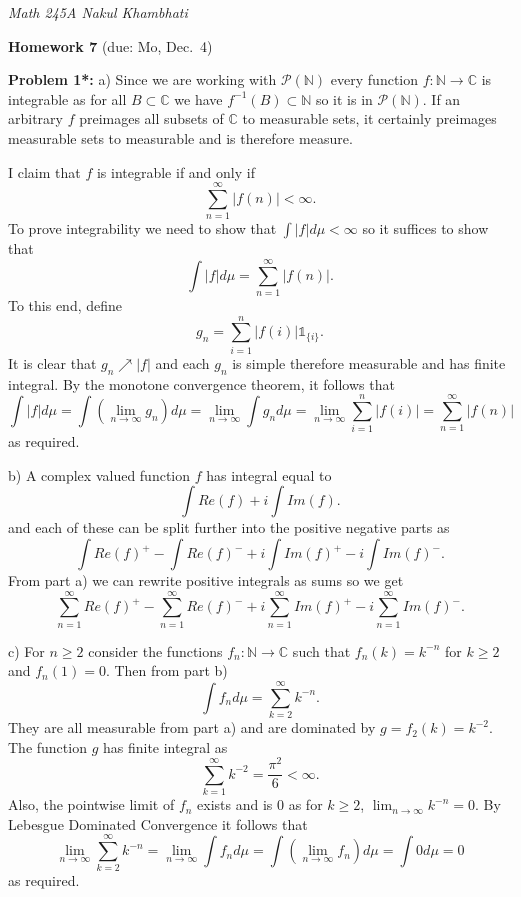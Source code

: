 \documentclass[12pt]{amsart} %
\def\N{\mathbb{N}}
\def\C{\mathbb{C}}
\def\P{\mathcal{P}}
\def\1{\mathbb{1}}
\begin{document}
\thispagestyle{empty}
\pagestyle{empty}
\noindent 
\textsl{Math 245A  \hfill Nakul Khambhati}

\bigskip\bigskip
\centerline {\textbf{Homework 7} (due: Mo, Dec.~4) }

 
 \bigskip
\noindent



\bigskip
\noindent
\textbf{Problem 1*:} 
a) Since we are working with $\P(\N)$ every function $f: \N \to \C$ is integrable as for all $B \subset \C$ we have
$f^{-1}(B) \subset \N$ so it is in $\P\left( \N \right)$. If an arbitrary $f$ preimages all subsets of $\C$ to measurable sets, it certainly preimages measurable sets to measurable and is therefore measure.

I claim that $f$ is integrable if and only if $$\sum_{n=1}^{\infty} |f(n)| < \infty.$$ To prove integrability we need to show that 
$\int |f| d\mu < \infty$ so it suffices to show that $$\int |f| d\mu = \sum_{n=1}^{\infty} |f(n)|.$$ To this end, define $$g_n = \sum_{i=1}^{n} |f(i)| \1_{\{i\} }.$$ It is clear that $g_n \nearrow |f|$ and each $g_n$ is simple therefore measurable and has finite integral.  By the monotone convergence theorem, it follows that $$\int |f| d\mu = \int \left(\lim_{n \to \infty} g_n\right) d\mu = \lim_{n \to \infty}
\int g_n d\mu = \lim_{n \to \infty} \sum_{i=1}^{n} |f(i)| = \sum_{n=1}^{\infty} |f(n)|$$ as required. 
    

\smallskip
  b) A complex valued function $f$ has integral equal to  $$\int Re(f) + i \int Im(f).$$ and each of these can be split further into the positive negative parts as $$
  \int Re(f)^+ - \int Re(f)^- + i \int Im(f)^+ - i \int Im(f)^-.$$  From part a) we can rewrite positive integrals as sums so we get $$ \sum_{n=1}^{\infty}  Re(f)^+ - \sum_{n=1}^{\infty}  Re(f)^- + i \sum_{n=1}^{\infty}  Im(f)^+ - i \sum_{n=1}^{\infty}  Im(f)^-.$$ 
  
\smallskip
c) For $n \ge 2$ consider the functions $f_n: \N \to \C$ such that $f_n(k) = k^{-n}$ for  $k \ge 2$ and $f_n(1) = 0$. Then from part b)  $$
\int f_n d\mu = \sum_{k=2}^{\infty} k^{-n}.$$ They are all measurable from part a) and are dominated by $g= f_2(k) = k^{-2}$. The function $g$ has finite integral as  $$\sum_{k=1}^{\infty}k^{-2} = \frac{\pi^2}{6} < \infty.$$ Also, the pointwise limit of $f_n$ exists and is $0$ as for  $k \ge 2$, $\lim_{n \to \infty} k^{-n} = 0$. By Lebesgue Dominated Convergence it follows that $$\lim_{n \to \infty} \sum_{k=2}^{\infty} k^{-n} = \lim_{n \to \infty} \int f_n d\mu = \int \left( \lim_{n \to \infty} f_n \right) d\mu = \int 0 d\mu = 0$$ as required.   
  
\end{document}
